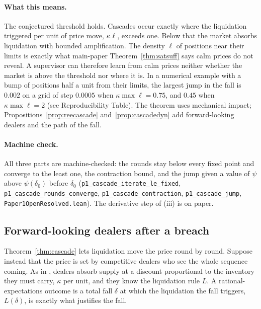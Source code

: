 \documentclass[12pt]{article}
\theoremstyle{definition}
\theoremstyle{remark}
\begin{document}
\paragraph{What this means.} The conjectured threshold holds. Cascades occur exactly where the liquidation triggered per unit of price move, $\kappa\ell$, exceeds one. Below that the market absorbs liquidation with bounded amplification. The density $\ell$ of positions near their limits is exactly what main-paper Theorem~\ref{thm:satsuff} says calm prices do not reveal. A supervisor can therefore learn from calm prices neither whether the market is above the threshold nor where it is. In a numerical example with a bump of positions half a unit from their limits, the largest jump in the fall is $0.002$ on a grid of step $0.0005$ when $\kappa\max\ell=0.75$, and $0.45$ when $\kappa\max\ell=2$ (see Reproducibility Table). The theorem uses mechanical impact; Propositions~\ref{prop:reecascade} and~\ref{prop:cascadedyn} add forward-looking dealers and the path of the fall.

\paragraph{Machine check.} All three parts are machine-checked: the rounds stay below every fixed point and converge to the least one, the contraction bound, and the jump given a value of $\psi$ above $\psi(\delta_0)$ before $\delta_0$ (\texttt{p1\_cascade\_iterate\_le\_fixed}, \texttt{p1\_cascade\_rounds\_converge}, \texttt{p1\_cascade\_contraction}, \texttt{p1\_cascade\_jump}, \nolinkurl{Paper1OpenResolved.lean}). The derivative step of (iii) is on paper.

\subsection{Forward-looking dealers after a breach}

Theorem~\ref{thm:cascade} lets liquidation move the price round by round. Suppose instead that the price is set by competitive dealers who see the whole sequence coming. As in \citet{grossman1988}, dealers absorb supply at a discount proportional to the inventory they must carry, $\kappa$ per unit, and they know the liquidation rule $L$. A rational-expectations outcome is a total fall $\delta$ at which the liquidation the fall triggers, $L(\delta)$, is exactly what justifies the fall.
\end{document}
